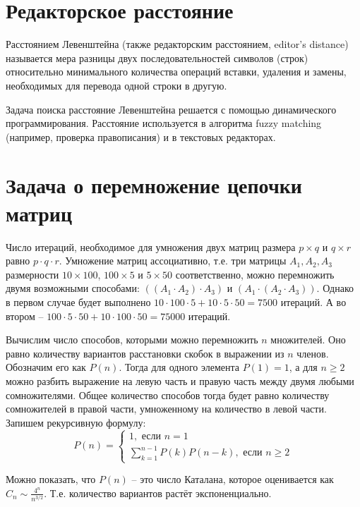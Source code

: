 \documentclass[a4paper,11pt]{article}
\begin{document}
\section{Редакторское расстояние}
Расстоянием Левенштейна (также редакторским расстоянием, editor's distance)
называется мера разницы двух последовательностей символов (строк)
относительно минимального количества операций вставки, удаления и замены,
необходимых для перевода одной строки в другую.

Задача поиска расстояние Левенштейна решается с помощью динамического
программирования. Расстояние используется в алгоритма fuzzy matching
(например, проверка правописания) и в текстовых редакторах.

\section{Задача о перемножение цепочки матриц}
Число итераций, необходимое для умножения двух матриц размера $p \times q$
и $q \times r$ равно $p \cdot q \cdot r$. Умножение матриц ассоциативно,
т.е. три матрицы $A_1, A_2, A_3$ размерности
$10 \times 100$, $100 \times 5$ и $5 \times 50$ соответственно, можно
перемножить двумя возможными способами: $((A_1 \cdot A_2) \cdot A_3)$ и
$(A_1 \cdot (A_2 \cdot A_3))$. Однако в первом случае будет выполнено 
$10 \cdot 100 \cdot 5 + 10 \cdot 5 \cdot 50 = 7500$ итераций. А во втором
-- $100 \cdot 5 \cdot 50 + 10 \cdot 100 \cdot 50 = 75000$ итераций.

Вычислим число способов, которыми можно перемножить $n$ множителей. Оно
равно количеству вариантов расстановки скобок в выражении из $n$ членов.
Обозначим его как $P(n)$. Тогда для одного элемента $P(1) = 1$, а для 
$n \geqslant 2$ можно разбить выражение на левую часть и правую часть
между двумя любыми сомножителями. Общее количество способов тогда 
будет равно количеству сомножителей в правой части, умноженному на
количество в левой части. Запишем рекурсивную формулу:
\begin{equation*}
  P(n) = \begin{cases}
    1, \text{ если } n = 1 \\
    \sum_{k=1}^{n-1} P(k) P(n-k), \text{ если } n \geqslant 2
    \end{cases}
\end{equation*}

Можно показать, что $P(n)$ -- это число Каталана, которое оценивается как
$C_n \sim \frac{4^n}{n^{3/2}}$. Т.е. количество вариантов растёт
экспоненциально.
\end{document}
